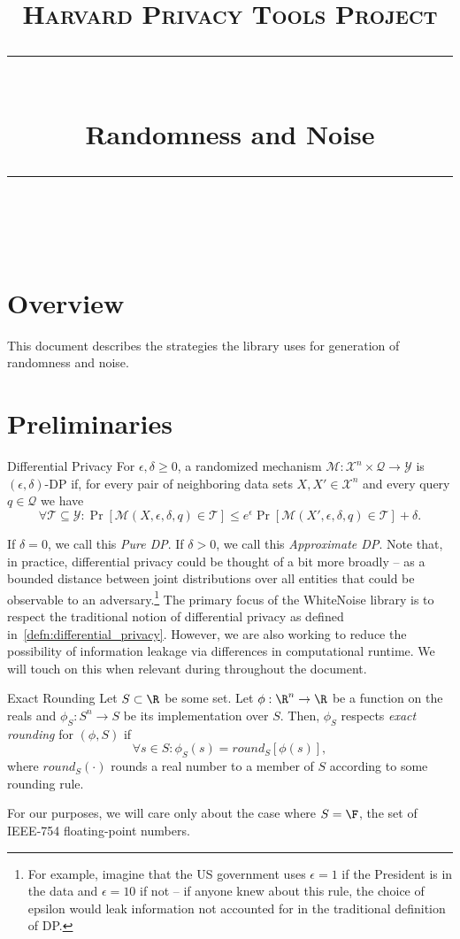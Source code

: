 \documentclass[11pt]{scrartcl} %
\title{
	\normalfont\normalsize
	\textsc{Harvard Privacy Tools Project}\\ %
	\vspace{25pt} %
	\rule{\linewidth}{0.5pt}\\ %
	\vspace{20pt} %
	{\huge Randomness and Noise}\\ %
	\vspace{12pt} %
	\rule{\linewidth}{2pt}\\ %
	\vspace{12pt} %
}
\author{} %
\date{} %
\begin{document}
\maketitle

\section{Overview}
This document describes the strategies the library uses for generation of randomness and noise.

\section{Preliminaries}
\begin{definition}
	\label{defn:differential_privacy}
	Differential Privacy \cite{DMNS06} \newline
	For $\epsilon, \delta \geq 0$, a randomized mechanism
	$\mathcal{M}: \mathcal{X}^n \times \mathcal{Q} \rightarrow \mathcal{Y}$ is
	$(\epsilon, \delta)$-DP if, for every pair of neighboring data sets $X, X' \in \mathcal{X}^n$ and
	every query $q \in \mathcal{Q}$ we have
	\[ \forall \mathcal{T} \subseteq \mathcal{Y}: \Pr[\mathcal{M}(X, \epsilon, \delta, q) \in \mathcal{T}] \leq e^{\epsilon} \Pr[\mathcal{M}(X', \epsilon, \delta, q) \in \mathcal{T}] + \delta. \]
\end{definition}
If $\delta = 0$, we call this \emph{Pure DP}. If $\delta > 0$, we call this \emph{Approximate DP}.
Note that, in practice, differential privacy could be thought of a bit more broadly -- as a bounded
distance between joint distributions over all entities that could be observable to an adversary.\footnote{For example, imagine that the 
US government uses $\epsilon = 1$ if the President is in the data and $\epsilon = 10$
if not -- if anyone knew about this rule, the choice of epsilon would leak information not accounted for in the
traditional definition of DP.} The primary focus of the WhiteNoise library is to respect the traditional notion of 
differential privacy as defined in~\ref{defn:differential_privacy}. However, we are also working to
reduce the possibility of information leakage via differences in computational runtime. We will touch on this when relevant 
during throughout the document.

\begin{definition}
	\label{defn:exact_rounding}
	Exact Rounding \newline
	Let $S \subset \R$ be some set.
	Let $\phi: \R^n \rightarrow \R$ be a function on the reals and $\phi_{S}: S^n \rightarrow S$ be its implementation over $S$.
	Then, $\phi_{S}$ respects \emph{exact rounding} for $(\phi, S)$ if
	\[ \forall s \in S: \phi_{S}(s) = round_{S}[\phi(s)], \]
	where $round_{S}(\cdot)$ rounds a real number to a member of $S$ according to some rounding rule.
\end{definition}
For our purposes, we will care only about the case where $S = \F$, the set of IEEE-754 floating-point numbers.
\end{document}
